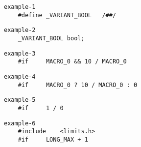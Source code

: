 \documentclass{jsarticle}
\begin{document}
\setlength{\baselineskip}{12pt}

\begin{verbatim}
example-1
    #define _VARIANT_BOOL   /##/
\end{verbatim}

\begin{verbatim}
example-2
    _VARIANT_BOOL bool;
\end{verbatim}

\vspace{8pt}

\begin{verbatim}
example-3
    #if     MACRO_0 && 10 / MACRO_0
\end{verbatim}

\begin{verbatim}
example-4
    #if     MACRO_0 ? 10 / MACRO_0 : 0
\end{verbatim}

\begin{verbatim}
example-5
    #if     1 / 0
\end{verbatim}

\vspace{8pt}

\begin{verbatim}
example-6
    #include    <limits.h>
    #if     LONG_MAX + 1
\end{verbatim}
\end{document}
